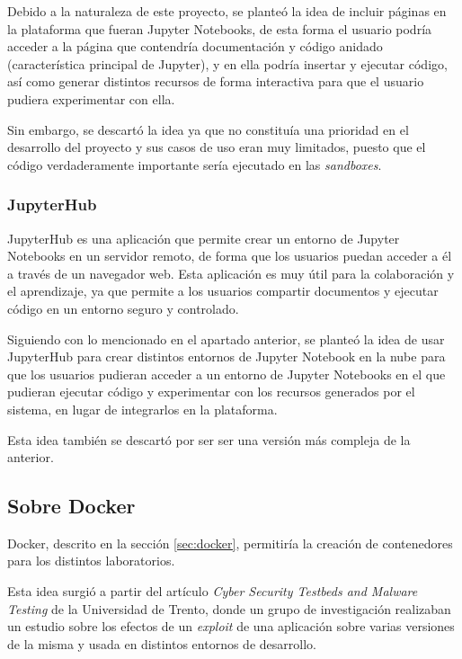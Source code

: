                 Debido a la naturaleza de este proyecto, se planteó la idea de incluir páginas en la plataforma que fueran Jupyter Notebooks, de esta forma el usuario podría acceder a la página que contendría documentación y código anidado (característica principal de Jupyter), y en ella podría insertar y ejecutar código, así como generar distintos recursos de forma interactiva para que el usuario pudiera experimentar con ella.

                Sin embargo, se descartó la idea ya que no constituía una prioridad en el desarrollo del proyecto y sus casos de uso eran muy limitados, puesto que el código verdaderamente importante sería ejecutado en las \textit{sandboxes}.
                

            \subsubsection{JupyterHub}

                JupyterHub \cite{jupyterhub} es una aplicación que permite crear un entorno de Jupyter Notebooks en un servidor remoto, de forma que los usuarios puedan acceder a él a través de un navegador web. Esta aplicación es muy útil para la colaboración y el aprendizaje, ya que permite a los usuarios compartir documentos y ejecutar código en un entorno seguro y controlado.
                
                Siguiendo con lo mencionado en el apartado anterior, se planteó la idea de usar JupyterHub para crear distintos entornos de Jupyter Notebook en la nube para que los usuarios pudieran acceder a un entorno de Jupyter Notebooks en el que pudieran ejecutar código y experimentar con los recursos generados por el sistema, en lugar de integrarlos en la plataforma.

                Esta idea también se descartó por ser ser una versión más compleja de la anterior.
                
                \newpage

                
        \subsection{Sobre Docker}

            Docker, descrito en la sección \ref{sec:docker}, permitiría la creación de contenedores para los distintos laboratorios.
                
            Esta idea surgió a partir del artículo \textit{Cyber Security Testbeds and Malware Testing} \cite{securitylab-malware-analysis} de la Universidad de Trento, donde un grupo de investigación realizaban un estudio sobre los efectos de un \textit{exploit} de una aplicación sobre varias versiones de la misma y usada en distintos entornos de desarrollo.

